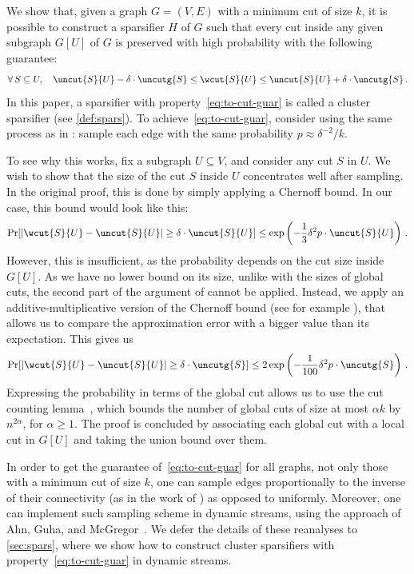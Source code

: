 We show that, given a graph $G=(V, E)$ with a minimum cut of size $k$, it is possible to construct a sparsifier $H$ of $G$ such that every cut inside any given subgraph $G[U]$ of $G$ is preserved with high probability with the following guarantee:
\begin{equation}
	\label{eq:to-cut-guar}
	\forall \, S \subseteq U, \quad \uncut{S}{U} - \delta \cdot \uncutg{S} \le \wcut{S}{U}  \le \uncut{S}{U} + \delta \cdot \uncutg{S}\,.
\end{equation}
In this paper, a sparsifier with property~\eqref{eq:to-cut-guar} is called a cluster sparsifier (see \cref{def:spars}).
To achieve~\eqref{eq:to-cut-guar}, consider using the same process as in \cite{karger1994random}: sample each edge with the same probability $p \approx {\delta^{-2}/ k}$.

To see why this works, fix a subgraph $U \subseteq V$, and consider any cut $S$ in $U$. 
We wish to show that the size of the cut $S$ inside $U$ concentrates well after sampling. In the original proof, this is done by simply applying a Chernoff bound. In our case, this bound would look like this:
\begin{equation*}
	\Pr[|\wcut{S}{U} - \uncut{S}{U}| \geq \delta \cdot \uncut{S}{U}] \leq \exp\left(-\frac{1}{3} \delta^2 p \cdot \uncut{S}{U} \right) \, .
\end{equation*}
\noindent
However, this is insufficient, as the probability depends on the cut size inside $G[U]$. As we have no lower bound on its size, unlike with the sizes of global cuts, the second part of the argument of \cite{karger1994random} cannot be applied. Instead, we apply an additive-multiplicative version of the Chernoff bound (see for example \cite{streamexpdec}), that allows us to compare the approximation error with a bigger value than its expectation. This gives us
\begin{equation*}
	\Pr[|\wcut{S}{U} - \uncut{S}{U}| \geq \delta \cdot \uncutg{S}] \leq 2\exp\left(-\frac{1}{100} \delta^2 p \cdot \uncutg{S} \right) \, .
\end{equation*}
Expressing the probability in terms of the global cut allows us to use the cut counting lemma~\cite{karger1993global}, which bounds the number of global cuts of size at most $\alpha k$ by $n^{2\alpha}$,  for $\alpha \geq 1$. The proof is concluded by associating each global cut with a local cut in $G[U]$ and taking the union bound over them.

In order to get the guarantee of~\eqref{eq:to-cut-guar} for all graphs, not only those with a minimum cut of size $k$, one can sample edges proportionally to the inverse of their connectivity (as in the work of \cite{fungspars}) as opposed to uniformly. Moreover, one can implement such sampling scheme in dynamic streams, using the approach of Ahn, Guha, and McGregor~\cite{sparsdynamicstreams}. We defer the details of these reanalyses to \cref{sec:spars}, where we show how to construct cluster sparsifiers with property~\eqref{eq:to-cut-guar} in dynamic streams.

